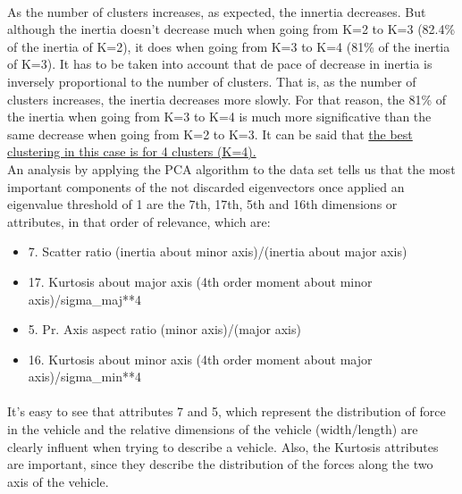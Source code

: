 \documentclass[12pt, a4paper]{article}
\begin{document}
\paragraph{}As the number of clusters increases, as expected, the innertia decreases. But although the inertia doesn't decrease much when going from K=2 to K=3 (82.4\% of the inertia of K=2), it does when going from K=3 to K=4 (81\% of the inertia of K=3). It has to be taken into account that de pace of decrease in inertia is inversely proportional to the number of clusters. That is, as the number of clusters increases, the inertia decreases more slowly. For that reason, the 81\% of the inertia when going from K=3 to K=4 is much more significative than the same decrease when going from K=2 to K=3. It can be said that \underline{the best clustering in this case is for 4 clusters (K=4).}\\

An analysis by applying the PCA algorithm to the data set tells us that the most important components of the not discarded eigenvectors once applied an eigenvalue threshold of 1 are the 7th, 17th, 5th and 16th dimensions or attributes, in that order of relevance, which are:
\begin{itemize}
	\item 7.   Scatter ratio (inertia about minor axis)/(inertia about major axis)
	\item 17. Kurtosis about major axis (4th order moment about minor axis)/sigma\_maj**4
	\item 5.   Pr. Axis aspect ratio (minor axis)/(major axis)
	\item 16. Kurtosis about minor axis (4th order moment about major axis)/sigma\_min**4
\end{itemize}
\paragraph{}It's easy to see that attributes 7 and 5, which represent the distribution of force in the vehicle and the relative dimensions of the vehicle (width/length) are clearly influent when trying to describe a vehicle. Also, the Kurtosis attributes are important, since they describe the distribution of the forces along the two axis of the vehicle.\\
\end{document}
